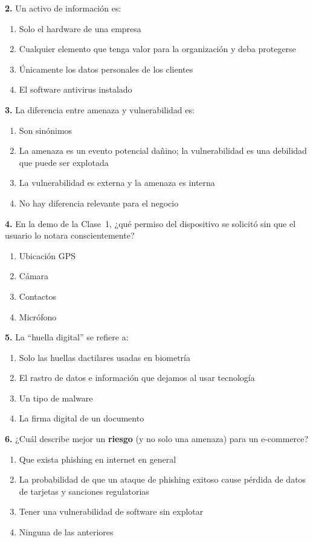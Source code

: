 \documentclass[12pt,a4paper]{article}
\begin{document}
\textbf{2.} Un activo de informaci\'on es:
\begin{enumerate}[label=\alph*), leftmargin=2.5em]
  \item Solo el hardware de una empresa
  \item Cualquier elemento que tenga valor para la organizaci\'on y deba protegerse
  \item \'Unicamente los datos personales de los clientes
  \item El software antivirus instalado
\end{enumerate}

\textbf{3.} La diferencia entre amenaza y vulnerabilidad es:
\begin{enumerate}[label=\alph*), leftmargin=2.5em]
  \item Son sin\'onimos
  \item La amenaza es un evento potencial da\~nino; la vulnerabilidad es una debilidad que puede ser explotada
  \item La vulnerabilidad es externa y la amenaza es interna
  \item No hay diferencia relevante para el negocio
\end{enumerate}

\textbf{4.} En la demo de la Clase~1, ¿qu\'e permiso del dispositivo se solicit\'o
sin que el usuario lo notara conscientemente?
\begin{enumerate}[label=\alph*), leftmargin=2.5em]
  \item Ubicaci\'on GPS
  \item C\'amara
  \item Contactos
  \item Micr\'ofono
\end{enumerate}

\textbf{5.} La ``huella digital'' se refiere a:
\begin{enumerate}[label=\alph*), leftmargin=2.5em]
  \item Solo las huellas dactilares usadas en biometr\'ia
  \item El rastro de datos e informaci\'on que dejamos al usar tecnolog\'ia
  \item Un tipo de malware
  \item La firma digital de un documento
\end{enumerate}

\textbf{6.} ¿Cu\'al describe mejor un \textbf{riesgo} (y no solo una amenaza)
para un e-commerce?
\begin{enumerate}[label=\alph*), leftmargin=2.5em]
  \item Que exista phishing en internet en general
  \item La probabilidad de que un ataque de phishing exitoso cause p\'erdida de datos de tarjetas y sanciones regulatorias
  \item Tener una vulnerabilidad de software sin explotar
  \item Ninguna de las anteriores
\end{enumerate}
\end{document}
